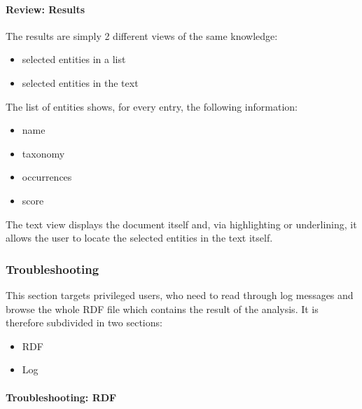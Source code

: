 \documentclass[12pt,oneside,svgnames]{memoir}
\begin{document}
\paragraph*{Review: Results}\label{review-results}

The results are simply 2 different views of the same knowledge:

\begin{itemize}
\itemsep1pt\parskip0pt
\item
  selected entities in a list
\item
  selected entities in the text
\end{itemize}

The list of entities shows, for every entry, the following information:

\begin{itemize}
\itemsep1pt\parskip0pt
\item
  name
\item
  taxonomy
\item
  occurrences
\item
  score
\end{itemize}

The text view displays the document itself and, via highlighting or
underlining, it allows the user to locate the selected entities in the
text itself.

\subsubsection*{Troubleshooting}\label{troubleshooting}

This section targets privileged users, who need to read through log
messages and browse the whole RDF file which contains the result of the
analysis. It is therefore subdivided in two sections:

\begin{itemize}
\itemsep1pt\parskip0pt
\item
  RDF
\item
  Log
\end{itemize}

\paragraph*{Troubleshooting: RDF}\label{troubleshooting-rdf}
\end{document}
